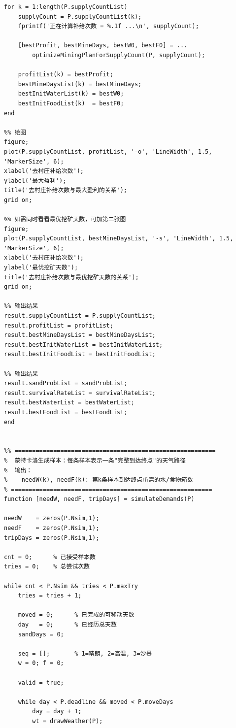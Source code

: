 \begin{verbatim}
for k = 1:length(P.supplyCountList)
    supplyCount = P.supplyCountList(k);
    fprintf('正在计算补给次数 = %.1f ...\n', supplyCount);

    [bestProfit, bestMineDays, bestW0, bestF0] = ...
        optimizeMiningPlanForSupplyCount(P, supplyCount);

    profitList(k) = bestProfit;
    bestMineDaysList(k) = bestMineDays;
    bestInitWaterList(k) = bestW0;
    bestInitFoodList(k)  = bestF0;
end

%% 绘图
figure;
plot(P.supplyCountList, profitList, '-o', 'LineWidth', 1.5, 'MarkerSize', 6);
xlabel('去村庄补给次数');
ylabel('最大盈利');
title('去村庄补给次数与最大盈利的关系');
grid on;

%% 如需同时看看最优挖矿天数，可加第二张图
figure;
plot(P.supplyCountList, bestMineDaysList, '-s', 'LineWidth', 1.5, 'MarkerSize', 6);
xlabel('去村庄补给次数');
ylabel('最优挖矿天数');
title('去村庄补给次数与最优挖矿天数的关系');
grid on;

%% 输出结果
result.supplyCountList = P.supplyCountList;
result.profitList = profitList;
result.bestMineDaysList = bestMineDaysList;
result.bestInitWaterList = bestInitWaterList;
result.bestInitFoodList = bestInitFoodList;

%% 输出结果
result.sandProbList = sandProbList;
result.survivalRateList = survivalRateList;
result.bestWaterList = bestWaterList;
result.bestFoodList = bestFoodList;
end


%% =========================================================
%  蒙特卡洛生成样本：每条样本表示一条"完整到达终点"的天气路径
%  输出：
%    needW(k), needF(k): 第k条样本到达终点所需的水/食物箱数
% =========================================================
function [needW, needF, tripDays] = simulateDemands(P)

needW    = zeros(P.Nsim,1);
needF    = zeros(P.Nsim,1);
tripDays = zeros(P.Nsim,1);

cnt = 0;      % 已接受样本数
tries = 0;    % 总尝试次数

while cnt < P.Nsim && tries < P.maxTry
    tries = tries + 1;

    moved = 0;      % 已完成的可移动天数
    day   = 0;      % 已经历总天数
    sandDays = 0;

    seq = [];       % 1=晴朗, 2=高温, 3=沙暴
    w = 0; f = 0;

    valid = true;

    while day < P.deadline && moved < P.moveDays
        day = day + 1;
        wt = drawWeather(P);


\end{verbatim}

